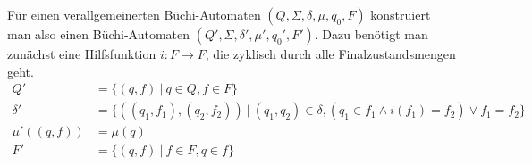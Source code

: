 Für einen verallgemeinerten Büchi-Automaten $(Q,\Sigma,\delta,\mu,q_0,F)$ konstruiert man also einen Büchi-Automaten $(Q',\Sigma,\delta',\mu',q_0',F')$.
Dazu benötigt man zunächst eine Hilfsfunktion $i : F\rightarrow F$, die zyklisch durch alle Finalzustandsmengen geht.
\begin{align*}
  Q' &= \{ (q,f)\ |\ q\in Q, f\in F \}\\
  \delta' &= \{ ((q_1,f_1),(q_2,f_2))\ |\ (q_1,q_2)\in\delta, (q_1\in f_1\land i(f_1)=f_2)\lor f_1=f_2\}\\
  \mu'((q,f)) &= \mu(q)\\
  F' &= \{ (q,f)\ |\ f\in F, q\in f \}
\end{align*}
